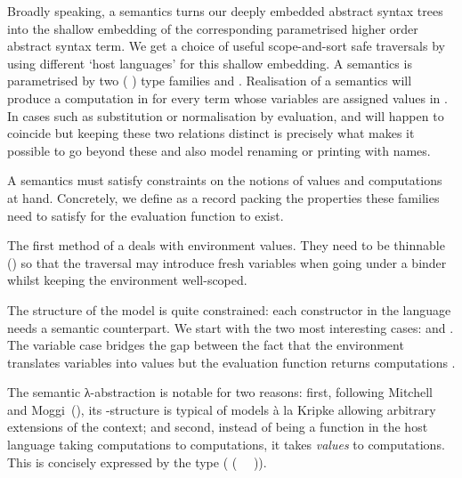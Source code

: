 Broadly speaking, a semantics turns our deeply embedded abstract syntax trees
into the shallow embedding of the corresponding parametrised higher order abstract
syntax term. We get a choice of useful scope-and-sort safe traversals by using
different `host languages' for this shallow embedding. A semantics is parametrised
by two ( ) type families  and . Realisation of a
semantics will produce a computation in  for every term whose variables are
assigned values in . In cases such as substitution or normalisation by evaluation,
 and  will happen to coincide but keeping these two relations distinct
is precisely what makes it possible to go beyond these and also model renaming or
printing with names.

A semantics must satisfy constraints on the notions of values  and computations
 at hand. Concretely, we define  as a record packing the properties
these families need to satisfy for the evaluation function to exist.


The first method of a  deals with environment values. They
need to be thinnable () so that the traversal
may introduce fresh variables when going under a binder whilst keeping
the environment well-scoped.


The structure of the model is quite constrained: each constructor
in the language needs a semantic counterpart. We start with the
two most interesting cases:  and . The variable
case bridges the gap between the fact that the environment translates
variables into values  but the evaluation function returns
computations .


The semantic λ-abstraction is notable for two reasons: first, following
Mitchell and Moggi~(\citeyear{mitchell1991kripke}), its -structure is
typical of models à la Kripke allowing arbitrary extensions of the context;
and second, instead of being a function in the host language taking
computations to computations,  it takes \emph{values} to computations.
This is concisely expressed by the type ({ (~  ~)}).

